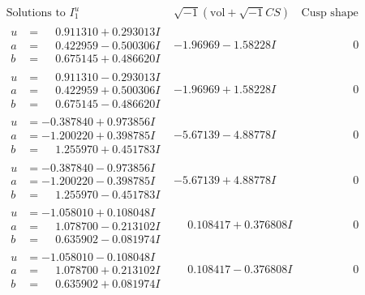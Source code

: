 \documentclass[1p]{elsarticle_modified}
\theoremstyle{definition}
\newcommand{\I}{\sqrt{-1}}
\begin{document}
$$\begin{array}{c|c|c}  
\text{Solutions to }I^u_{1}& \I (\text{vol} + \sqrt{-1}CS) & \text{Cusp shape}\\
 \hline 
\begin{aligned}
u &= \phantom{-}0.911310 + 0.293013 I \\
a &= \phantom{-}0.422959 - 0.500306 I \\
b &= \phantom{-}0.675145 + 0.486620 I\end{aligned}
 & -1.96969 - 1.58228 I & \phantom{-0.000000 } 0 \\ \hline\begin{aligned}
u &= \phantom{-}0.911310 - 0.293013 I \\
a &= \phantom{-}0.422959 + 0.500306 I \\
b &= \phantom{-}0.675145 - 0.486620 I\end{aligned}
 & -1.96969 + 1.58228 I & \phantom{-0.000000 } 0 \\ \hline\begin{aligned}
u &= -0.387840 + 0.973856 I \\
a &= -1.200220 + 0.398785 I \\
b &= \phantom{-}1.255970 + 0.451783 I\end{aligned}
 & -5.67139 - 4.88778 I & \phantom{-0.000000 } 0 \\ \hline\begin{aligned}
u &= -0.387840 - 0.973856 I \\
a &= -1.200220 - 0.398785 I \\
b &= \phantom{-}1.255970 - 0.451783 I\end{aligned}
 & -5.67139 + 4.88778 I & \phantom{-0.000000 } 0 \\ \hline\begin{aligned}
u &= -1.058010 + 0.108048 I \\
a &= \phantom{-}1.078700 - 0.213102 I \\
b &= \phantom{-}0.635902 - 0.081974 I\end{aligned}
 & \phantom{-}0.108417 + 0.376808 I & \phantom{-0.000000 } 0 \\ \hline\begin{aligned}
u &= -1.058010 - 0.108048 I \\
a &= \phantom{-}1.078700 + 0.213102 I \\
b &= \phantom{-}0.635902 + 0.081974 I\end{aligned}
 & \phantom{-}0.108417 - 0.376808 I & \phantom{-0.000000 } 0 \\ \hline\begin{aligned}

\end{aligned}
\end{array}$$
\end{document}
